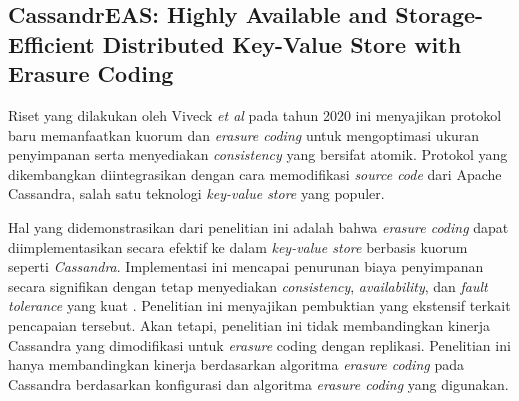 \subsection{CassandrEAS: Highly Available and Storage-Efficient Distributed Key-Value Store with Erasure Coding}

Riset yang dilakukan oleh Viveck \textit{et al} pada tahun 2020 ini menyajikan protokol baru memanfaatkan kuorum dan \textit{erasure coding} untuk mengoptimasi ukuran penyimpanan serta menyediakan \textit{consistency} yang bersifat atomik. Protokol yang dikembangkan diintegrasikan dengan cara memodifikasi \textit{source code} dari Apache Cassandra, salah satu teknologi \textit{key-value store} yang populer.

Hal yang didemonstrasikan dari penelitian ini adalah bahwa \textit{erasure coding} dapat diimplementasikan secara efektif ke dalam \textit{key-value store} berbasis kuorum seperti \textit{Cassandra}. Implementasi ini mencapai penurunan biaya penyimpanan secara signifikan dengan tetap menyediakan \textit{consistency}, \textit{availability}, dan \textit{fault tolerance} yang kuat \parencite{yiu2017erasure}. Penelitian ini menyajikan pembuktian yang ekstensif terkait pencapaian tersebut. Akan tetapi, penelitian ini tidak membandingkan kinerja Cassandra yang dimodifikasi untuk \textit{erasure} coding dengan replikasi. Penelitian ini hanya membandingkan kinerja berdasarkan algoritma \textit{erasure coding} pada Cassandra berdasarkan konfigurasi dan algoritma \textit{erasure coding} yang digunakan.

